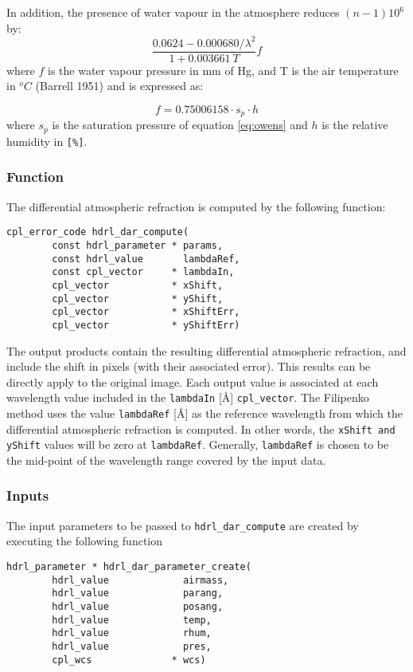 In addition, the presence of water vapour in the atmosphere reduces $(n-1)10^6$ by:
\begin{equation}
\frac{0.0624-0.000680/\lambda^2}{1 + 0.003661\ T} f
\end{equation}
where $f$ is the water vapour pressure in mm of Hg, and T is the air temperature in $^oC$ (Barrell 1951) and is expressed as:

\begin{equation}
f = 0.75006158 \cdot s_p \cdot h
\end{equation}
where $s_p$ is the saturation pressure of equation \ref{eq:owens} and $h$ is the relative humidity in \verb+[%]+.


\subsubsection{Function}

The differential atmospheric refraction is computed by the following function:
\begin{lstlisting}
cpl_error_code hdrl_dar_compute(
        const hdrl_parameter * params,
        const hdrl_value       lambdaRef, 
        const cpl_vector     * lambdaIn,
        cpl_vector           * xShift, 
        cpl_vector           * yShift, 
        cpl_vector           * xShiftErr, 
        cpl_vector           * yShiftErr)
\end{lstlisting}

The output products contain the resulting differential atmospheric refraction, and include the shift in pixels (with their associated error).
This results can be directly apply to the original image.
Each output value is associated at each wavelength value included in the \verb+lambdaIn+ [\AA] \verb+cpl_vector+.
The Filipenko method uses the value \verb+lambdaRef+ [\AA] as the reference wavelength from which the differential atmospheric
refraction is computed.  In other words, the \verb+xShift and yShift+ values will be zero at \verb+lambdaRef+.   Generally, \verb+lambdaRef+
is chosen to be the mid-point of the wavelength range covered by the input data.


\subsubsection{Inputs}
\label{sec:algorithms:refraction:inputs}
The input parameters to be passed to \verb+hdrl_dar_compute+ are created by executing the following function

\begin{lstlisting}
hdrl_parameter * hdrl_dar_parameter_create(
        hdrl_value             airmass,
        hdrl_value             parang,
        hdrl_value             posang,
        hdrl_value             temp,
        hdrl_value             rhum,
        hdrl_value             pres, 
        cpl_wcs              * wcs)
\end{lstlisting}


